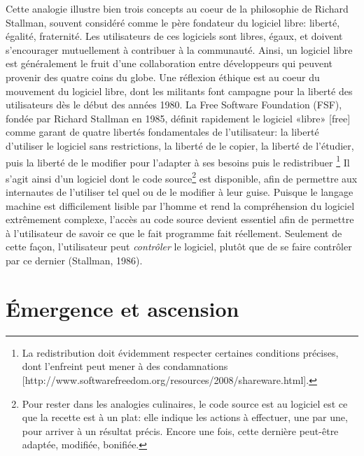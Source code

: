 \documentclass[
  letterpaper,
  DIV=11,
  numbers=noendperiod]{scrreprt}
\begin{document}
Cette analogie illustre bien trois concepts au coeur de la philosophie
de Richard Stallman, souvent considéré comme le père fondateur du
logiciel libre: liberté, égalité, fraternité. Les utilisateurs de ces
logiciels sont libres, égaux, et doivent s'encourager mutuellement à
contribuer à la communauté. Ainsi, un logiciel libre est généralement le
fruit d'une collaboration entre développeurs qui peuvent provenir des
quatre coins du globe. Une réflexion éthique est au coeur du mouvement
du logiciel libre, dont les militants font campagne pour la liberté des
utilisateurs dès le début des années 1980. La Free Software Foundation
(FSF), fondée par Richard Stallman en 1985, définit rapidement le
logiciel «libre» {[}free{]} comme garant de quatre libertés
fondamentales de l'utilisateur: la liberté d'utiliser le logiciel sans
restrictions, la liberté de le copier, la liberté de l'étudier, puis la
liberté de le modifier pour l'adapter à ses besoins puis le redistribuer
\footnote{La redistribution doit évidemment respecter certaines
  conditions précises, dont l'enfreint peut mener à des condamnations
  {[}http://www.softwarefreedom.org/resources/2008/shareware.html{]}.}
Il s'agit ainsi d'un logiciel dont le code source\footnote{Pour rester
  dans les analogies culinaires, le code source est au logiciel est ce
  que la recette est à un plat: elle indique les actions à effectuer,
  une par une, pour arriver à un résultat précis. Encore une fois, cette
  dernière peut-être adaptée, modifiée, bonifiée.} est disponible, afin
de permettre aux internautes de l'utiliser tel quel ou de le modifier à
leur guise. Puisque le langage machine est difficilement lisible par
l'homme et rend la compréhension du logiciel extrêmement complexe,
l'accès au code source devient essentiel afin de permettre à
l'utilisateur de savoir ce que le fait programme fait réellement.
Seulement de cette façon, l'utilisateur peut \emph{contrôler} le
logiciel, plutôt que de se faire contrôler par ce dernier (Stallman,
1986).

\hypertarget{uxe9mergence-et-ascension}{%
\section{Émergence et ascension}\label{uxe9mergence-et-ascension}}
\end{document}
